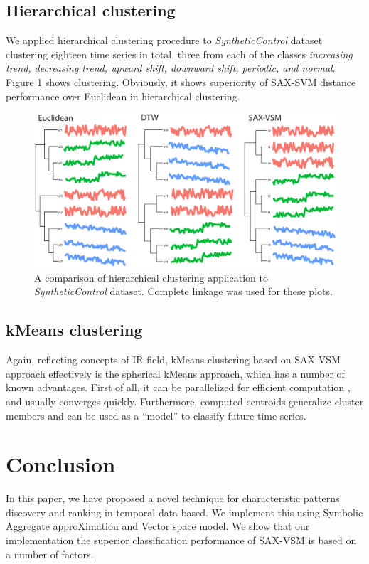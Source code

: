 \documentclass{llncs}
\begin{document}
\subsection{Hierarchical clustering}
We applied hierarchical clustering procedure to \textit{SyntheticControl} dataset clustering
eighteen time series in total, three from each of the classes \textit{increasing trend, decreasing
trend, upward shift, downward shift, periodic, and normal}. Figure \ref{fig:hc} shows
clustering. Obviously, it shows superiority of SAX-SVM distance performance over Euclidean in
hierarchical clustering.

\begin{figure}[t]
   \centering
   \includegraphics[width=115mm]{figures/clustering.eps}
   \caption{A comparison of hierarchical clustering application to \textit{SyntheticControl}
dataset. Complete linkage was used for these plots.
   }
   \label{fig:hc}
\end{figure}

\subsection{kMeans clustering}
Again, reflecting concepts of IR field, kMeans clustering based on SAX-VSM approach effectively
is the spherical kMeans approach, which has a number of known advantages. First of all, it can be
parallelized for efficient computation \cite{modha}, and usually converges quickly. Furthermore,
computed centroids generalize cluster members and can be used as a ``model'' to classify future 
time series.

\section{Conclusion}
In this paper, we have proposed a novel technique for characteristic patterns discovery 
and ranking in temporal data based. We implement this using Symbolic Aggregate approXimation 
and Vector space model. We show that our implementation the superior classification performance of
SAX-VSM is based on 
a number of factors. 
\end{document}
